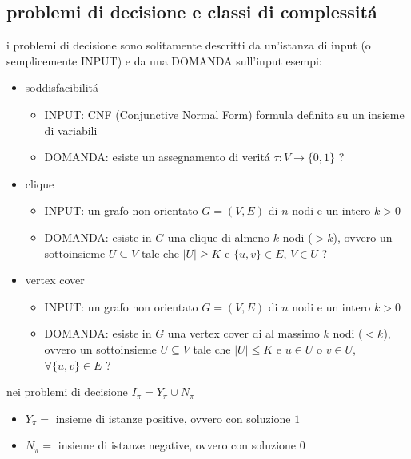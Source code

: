 \subsection*{problemi di decisione e classi di complessit\'a}
\begin{flushleft}
	i problemi di decisione sono solitamente descritti da un'istanza di input (o semplicemente INPUT) e da una DOMANDA sull'input
	esempi:
	\begin{itemize}
		\item soddisfacibilit\'a
			\begin{itemize}
				\item INPUT: CNF (Conjunctive Normal Form) formula definita su un insieme di variabili
				\item DOMANDA: esiste un assegnamento di verit\'a $\tau:V\rightarrow\{0,1\}$ ?
			\end{itemize}
		\item clique
			\begin{itemize}
				\item INPUT: un grafo non orientato $G=(V,E)$ di $n$ nodi e un intero $k>0$
				\item DOMANDA: esiste in $G$ una clique di almeno $k$ nodi ($>k$), ovvero un sottoinsieme $U\subseteq V$ tale che $|U|\geq K$ e $\{u,v\}\in E$, $V\in U$ ?
			\end{itemize}
		\item vertex cover
			\begin{itemize}
				\item INPUT: un grafo non orientato $G=(V,E)$ di $n$ nodi e un intero $k>0$
				\item DOMANDA: esiste in $G$ una vertex cover di al massimo $k$ nodi ($<k$), ovvero un sottoinsieme $U\subseteq V$ tale che $|U|\leq K$ e $u\in U$ o $v\in U$, $\forall\{u,v\}\in E$ ?
			\end{itemize}
	\end{itemize}
	nei problemi di decisione $I_{\pi}=Y_{\pi}\cup N_{\pi}$
	\begin{itemize}
		\item $Y_{\pi}=$ insieme di istanze positive, ovvero con soluzione $1$
		\item $N_{\pi}=$ insieme di istanze negative, ovvero con soluzione $0$
	\end{itemize}
\end{flushleft}



